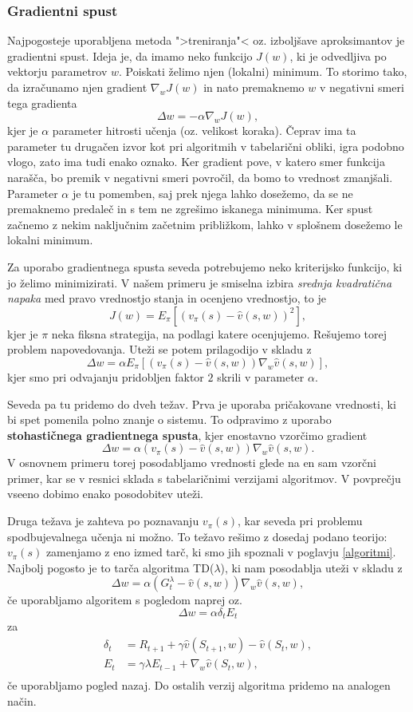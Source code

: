 \documentclass[12pt,a4paper]{amsart}
\theoremstyle{definition} %
\theoremstyle{plain} %
\begin{document}
\subsubsection{Gradientni spust}
Najpogosteje uporabljena metoda ">treniranja"<  oz. izboljšave aproksimantov je gradientni spust. 
Ideja je, da imamo neko funkcijo $J(w)$, ki je odvedljiva po vektorju parametrov $w$. Poiskati želimo njen 
(lokalni) minimum. To storimo tako, da izračunamo njen gradient $\nabla_wJ(w)$ in nato premaknemo $w$
v negativni smeri tega gradienta
$$
\Delta w = - \alpha \nabla_wJ(w),
$$
kjer je $\alpha$ parameter hitrosti učenja (oz. velikost koraka). Čeprav ima ta parameter tu drugačen izvor 
kot pri algoritmih v tabelarični obliki, igra podobno vlogo, zato ima tudi enako oznako. Ker gradient pove, v katero smer 
funkcija narašča, bo premik v negativni smeri povročil, da bomo to vrednost zmanjšali. Parameter 
$\alpha$ je tu pomemben, saj prek njega lahko dosežemo, da se ne premaknemo predaleč in s tem ne zgrešimo
iskanega minimuma. Ker spust začnemo z nekim naključnim začetnim približkom, lahko v splošnem 
dosežemo le lokalni minimum.

Za uporabo gradientnega spusta seveda potrebujemo neko kriterijsko funkcijo, ki jo želimo minimizirati. 
V našem primeru je smiselna izbira \textit{srednja kvadratična napaka} med pravo vrednostjo stanja in 
ocenjeno vrednostjo, to je 
$$
J(w) = E_\pi [(v_\pi(s) - \hat{v}(s, w))^2],
$$
kjer je $\pi$ neka fiksna strategija, na podlagi katere ocenjujemo. Rešujemo torej problem napovedovanja.
Uteži se potem prilagodijo v skladu z 
$$
\Delta w = \alpha E_\pi [(v_\pi(s) - \hat{v}(s, w)) \nabla_w \hat{v}(s, w)], 
$$
kjer smo pri odvajanju pridobljen faktor $2$ skrili v parameter $\alpha$.

Seveda pa tu pridemo do dveh težav. Prva je uporaba pričakovane vrednosti, ki bi spet pomenila polno 
znanje o sistemu. To odpravimo z uporabo \textbf{stohastičnega gradientnega spusta}, kjer 
enostavno vzorčimo gradient 
$$
\Delta w = \alpha (v_\pi(s) - \hat{v}(s, w)) \nabla_w \hat{v}(s, w). 
$$
V osnovnem primeru torej posodabljamo vrednosti glede na en sam vzorčni primer, kar se v resnici sklada 
s tabelaričnimi verzijami algoritmov.
V povprečju vseeno dobimo enako posodobitev uteži. 

Druga težava je zahteva po poznavanju $v_\pi(s)$, kar seveda pri problemu spodbujevalnega učenja ni 
možno. To težavo rešimo z dosedaj podano teorijo: $v_\pi(s)$ zamenjamo z eno izmed tarč, ki smo jih 
spoznali v poglavju \ref{algoritmi}. Najbolj pogosto je to tarča algoritma TD($\lambda$), ki nam 
posodablja uteži v skladu z 
$$
\Delta w = \alpha (G_t^\lambda - \hat{v}(s, w)) \nabla_w \hat{v}(s, w), 
$$
če uporabljamo algoritem s pogledom naprej oz. 
$$
\Delta w = \alpha \delta_t E_t
$$
za
\begin{align*}
    \delta_t &= R_{t+1} + \gamma \hat{v}(S_{t+1}, w) - \hat{v}(S_t, w), \\
    E_t &= \gamma \lambda E_{t-1} + \nabla_w \hat{v}(S_t, w), \\
\end{align*}
če uporabljamo pogled nazaj. Do ostalih verzij algoritma pridemo na analogen način.
\end{document}
